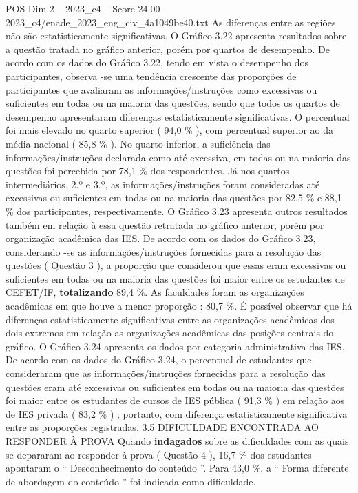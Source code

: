 \begin{textsample}{POS Dim 2 – 2023\_c4 – Score 24.00 – 2023\_c4/enade\_2023\_eng\_civ\_4a1049be40.txt}
As diferenças entre as regiões não são estatisticamente significativas.
O Gráfico 3.22 apresenta resultados sobre a questão tratada no gráfico anterior, porém por quartos de desempenho.
De acordo com os dados do Gráfico 3.22, tendo em vista o desempenho dos participantes, observa -se uma tendência crescente das proporções de participantes que avaliaram as informações/instruções como excessivas ou suficientes em todas ou na maioria das questões, sendo que todos os quartos de desempenho apresentaram diferenças estatisticamente significativas.
O percentual foi mais elevado no quarto superior ( 94,0 \% ), com percentual superior ao da média nacional ( 85,8 \% ).
No quarto inferior, a suficiência das informações/instruções declarada como até excessiva, em todas ou na maioria das questões foi percebida por 78,1 \% dos respondentes.
Já nos quartos intermediários, 2.º e 3.º, as informações/instruções foram consideradas até excessivas ou suficientes em todas ou na maioria das questões por 82,5 \% e 88,1 \% dos participantes, respectivamente.
O Gráfico 3.23 apresenta outros resultados também em relação à essa questão retratada no gráfico anterior, porém por organização acadêmica das IES.
De acordo com os dados do Gráfico 3.23, considerando -se as informações/instruções fornecidas para a resolução das questões ( Questão 3 ), a proporção que considerou que essas eram excessivas ou suficientes em todas ou na maioria das questões foi maior entre os estudantes de CEFET/IF, \textbf{totalizando} 89,4 \%.
As faculdades foram as organizações acadêmicas em que houve a menor proporção : 80,7 \%.
É possível observar que há diferenças estatisticamente significativas entre as organizações acadêmicas dos dois extremos em relação as organizações acadêmicas das posições centrais do gráfico.
O Gráfico 3.24 apresenta os dados por categoria administrativa das IES.
De acordo com os dados do Gráfico 3.24, o percentual de estudantes que consideraram que as informações/instruções fornecidas para a resolução das questões eram até excessivas ou suficientes em todas ou na maioria das questões foi maior entre os estudantes de cursos de IES pública ( 91,3 \% ) em relação aos de IES privada ( 83,2 \% ) ; portanto, com diferença estatisticamente significativa entre as proporções registradas. 3.5 DIFICULDADE ENCONTRADA AO RESPONDER À PROVA Quando \textbf{indagados} sobre as dificuldades com as quais se depararam ao responder à prova ( Questão 4 ), 16,7 \% dos estudantes apontaram o “ Desconhecimento do conteúdo ”.
Para 43,0 \%, a “ Forma diferente de abordagem do conteúdo ” foi indicada como dificuldade.

\end{textsample}
